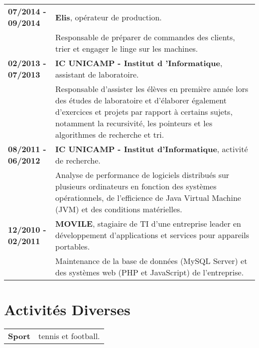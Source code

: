 \documentclass[10pt, a4paper]{article}
\begin{document}
\begin{tabular}{p{} p{}}

 \textbf{07/2014 - 09/2014}   & \textbf{Elis}, opérateur de production.\\
  & Responsable de préparer de commandes des clients, trier et engager le linge
  sur les machines.  \\

 \textbf{02/2013 - 07/2013}   & \textbf{IC UNICAMP - Institut d 'Informatique},
 assistant de laboratoire. \\
  & Responsable d'assister les élèves en première année lors des
 études de laboratoire et d'élaborer également d'exercices et projets par
 rapport à certains sujets, notamment la recursivité, les pointeurs et les
 algorithmes de recherche et tri. \\

 \textbf{08/2011 - 06/2012} & \textbf{IC UNICAMP - Institut d'Informatique},
 activité de recherche.  \\
 & Analyse de performance de logiciels distribués sur plusieurs ordinateurs
 en fonction des systèmes opérationnels, de l’efficience de Java Virtual Machine
 (JVM) et des conditions matérielles. \\
 
 
 \textbf{12/2010 - 02/2011} & \textbf{MOVILE}, stagiaire de TI d'une
 entreprise leader en développement d’applications et services pour
 appareils portables. \\
 & Maintenance de la base de données (MySQL Server) et des systèmes web (PHP
 et JavaScript) de l’entreprise.
 \\
\end{tabular}


\section{Activités Diverses}

\begin{tabular}{p{} p{}}

\textbf{Sport} & tennis et football. \\ 

\end{tabular}

\end{document}
